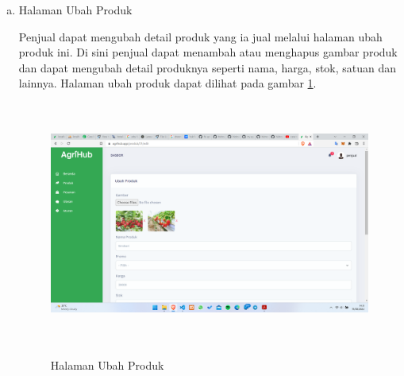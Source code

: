 \begin{enumerate}
\begin{enumerate}[a.]
		\item Halaman Ubah Produk
		\par Penjual dapat mengubah detail produk yang ia jual melalui halaman ubah produk ini. Di sini penjual dapat menambah atau menghapus gambar produk dan dapat mengubah detail produknya seperti nama, harga, stok, satuan dan lainnya. Halaman ubah produk dapat dilihat pada gambar \ref*{ubah_produk}.
		\begin{figure}[H]
			\centering
			{\includegraphics [width = 13.5cm, height= 8cm]{gambar/penjual/ubah_produk}}
			\caption{Halaman Ubah Produk}
			\label{ubah_produk}
		\end{figure}


\end{enumerate}
\end{enumerate}
